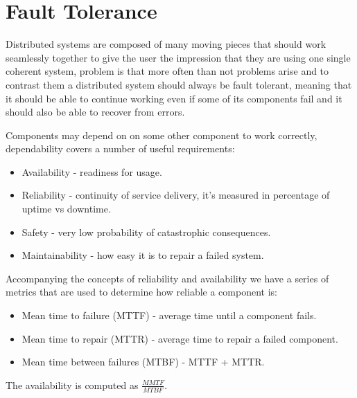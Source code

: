 \chapter{Fault Tolerance}
Distributed systems are composed of many moving pieces that should work seamlessly together to give the user the impression that they are using one single coherent system, problem is that more often than not problems arise and to contrast them a distributed system should always be fault tolerant, meaning that it should be able to continue working even if some of its components fail and it should also be able to recover from errors.

Components may depend on on some other component to work correctly, dependability covers a number of useful requirements:
\begin{itemize}
    \item Availability - readiness for usage.
    \item Reliability - continuity of service delivery, it's measured in percentage of uptime vs downtime.
    \item Safety - very low probability of catastrophic consequences.
    \item Maintainability - how easy it is to repair a failed system.
\end{itemize}
Accompanying the concepts of reliability and availability we have a series of metrics that are used to determine how reliable a component is:
\begin{itemize}
    \item Mean time to failure (MTTF) - average time until a component fails.
    \item Mean time to repair (MTTR) - average time to repair a failed component.
    \item Mean time between failures (MTBF) - MTTF + MTTR.
\end{itemize}
The availability is computed as $\frac{MMTF}{MTBF}$.

